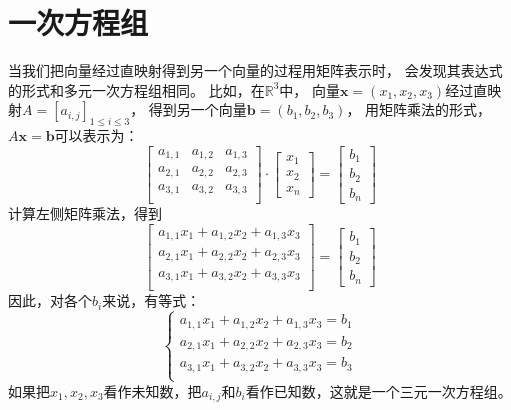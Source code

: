 \documentclass[12pt,UTF8,fontset=none]{ctexbook}
\begin{document}
\section{一次方程组}
当我们把向量经过直映射得到另一个向量的过程用矩阵表示时，
会发现其表达式的形式和多元一次方程组相同。
比如，在$\mathbb{R}^3$中，
向量$\mathbf{x} = (x_1, x_2, x_3)$经过直映射$A = [a_{i,j}]_{1\leqslant i \leqslant 3}$，
得到另一个向量$\mathbf{b} = (b_1, b_2, b_3)$，
用矩阵乘法的形式，$A\mathbf{x} = \mathbf{b}$可以表示为：
$$
    \begin{bmatrix}
        a_{1,1}     & a_{1,2}   & a_{1,3} \\
        a_{2,1}     & a_{2,2}   & a_{2,3} \\
        a_{3,1}     & a_{3,2}   & a_{3,3} \\
    \end{bmatrix} \cdot 
    \begin{bmatrix}
         x_{1} \\ x_{2} \\ x_{n} 
    \end{bmatrix} = 
    \begin{bmatrix}
        b_{1} \\ b_{2} \\ b_{n} 
    \end{bmatrix}
$$
计算左侧矩阵乘法，得到
$$
    \begin{bmatrix}
        a_{1,1} x_1 + a_{1,2} x_2 +  a_{1,3} x_3 \\
        a_{2,1} x_1 + a_{2,2} x_2 +  a_{2,3} x_3 \\
        a_{3,1} x_1 + a_{3,2} x_2 +  a_{3,3} x_3 \\
    \end{bmatrix} = 
    \begin{bmatrix}
        b_{1} \\ b_{2} \\ b_{n} 
    \end{bmatrix} 
$$
因此，对各个$b_i$来说，有等式：
$$
\left\{
    \begin{aligned}
        a_{1,1} x_1 + a_{1,2} x_2 +  a_{1,3} x_3 = b_1 \\
        a_{2,1} x_1 + a_{2,2} x_2 +  a_{2,3} x_3 = b_2 \\
        a_{3,1} x_1 + a_{3,2} x_2 +  a_{3,3} x_3 = b_3 \\
    \end{aligned}
\right.
$$
如果把$x_1, x_2, x_3$看作未知数，把$a_{i,j}$和$b_i$看作已知数，这就是一个三元一次方程组。
\end{document}
